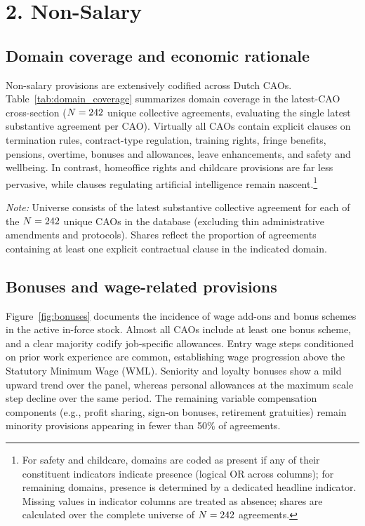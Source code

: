 \section*{2. Non-Salary}
\label{sec:non_salary}

\subsection*{Domain coverage and economic rationale}

Non-salary provisions are extensively codified across Dutch CAOs. Table~\ref{tab:domain_coverage} summarizes domain coverage in the latest-CAO cross-section ($N = \GenUniqueCAOs$ unique collective agreements, evaluating the single latest substantive agreement per CAO). Virtually all CAOs contain explicit clauses on termination rules, contract-type regulation, training rights, fringe benefits, pensions, overtime, bonuses and allowances, leave enhancements, and safety and wellbeing. In contrast, homeoffice rights and childcare provisions are far less pervasive, while clauses regulating artificial intelligence remain nascent.\footnote{For safety and childcare, domains are coded as present if any of their constituent indicators indicate presence (logical OR across columns); for remaining domains, presence is determined by a dedicated headline indicator. Missing values in indicator columns are treated as absence; shares are calculated over the complete universe of $N = \GenUniqueCAOs$ agreements.}

\begin{table}[H]
    \centering
    \caption{Domain coverage in latest-CAO cross-section ($N = \GenUniqueCAOs$)}
    \label{tab:domain_coverage}
    
    \vspace{1ex}
    \parbox{\linewidth}{\footnotesize \textit{Note:} Universe consists of the latest substantive collective agreement for each of the $N = \GenUniqueCAOs$ unique CAOs in the database (excluding thin administrative amendments and protocols). Shares reflect the proportion of agreements containing at least one explicit contractual clause in the indicated domain.}
\end{table}

\subsection*{Bonuses and wage-related provisions}

Figure~\ref{fig:bonuses} documents the incidence of wage add-ons and bonus schemes in the active in-force stock. Almost all CAOs include at least one bonus scheme, and a clear majority codify job-specific allowances. Entry wage steps conditioned on prior work experience are common, establishing wage progression above the Statutory Minimum Wage (WML). Seniority and loyalty bonuses show a mild upward trend over the panel, whereas personal allowances at the maximum scale step decline over the same period. The remaining variable compensation components (e.g., profit sharing, sign-on bonuses, retirement gratuities) remain minority provisions appearing in fewer than 50\% of agreements.

